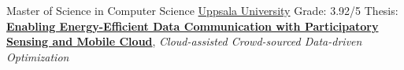 {Master of Science in Computer Science}
{\href{https://uu.se}{Uppsala University}}
{\Large{}}
{\small{Grade: 3.92/5}}
{
  \vspace{-2pt} Thesis: \href{https://uu.diva-portal.org/smash/record.jsf?pid=diva2:897798&dswid=-1613}{\textbf{Enabling Energy-Efficient Data Communication with Participatory Sensing and Mobile Cloud}}, \textit{Cloud-assisted Crowd-sourced Data-driven Optimization}
}
